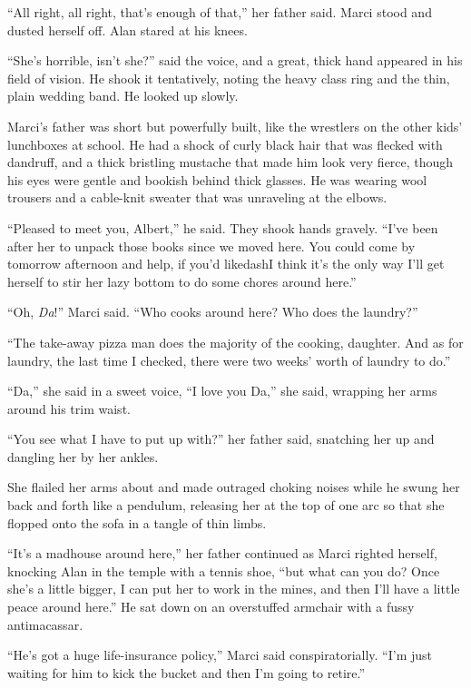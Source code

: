 ``All right, all right, that's enough of that,'' her father said. 
Marci stood and dusted herself off.  Alan stared at his knees.

``She's horrible, isn't she?'' said the voice, and a great, thick hand
appeared in his field of vision.  He shook it tentatively, noting the
heavy class ring and the thin, plain wedding band.  He looked up
slowly.

Marci's father was short but powerfully built, like the wrestlers on
the other kids' lunchboxes at school.  He had a shock of curly black
hair that was flecked with dandruff, and a thick bristling mustache
that made him look very fierce, though his eyes were gentle and
bookish behind thick glasses.  He was wearing wool trousers and a
cable-knit sweater that was unraveling at the elbows.

``Pleased to meet you, Albert,'' he said.  They shook hands gravely. 
``I've been after her to unpack those books since we moved here.  You
could come by tomorrow afternoon and help, if you'd likedash{}I think
it's the only way I'll get herself to stir her lazy bottom to do some
chores around here.''

``Oh, \textit{Da}!'' Marci said.  ``Who cooks around here?  Who does
the laundry?''

``The take-away pizza man does the majority of the cooking, daughter. 
And as for laundry, the last time I checked, there were two weeks'
worth of laundry to do.''

``Da,'' she said in a sweet voice, ``I love you Da,'' she said,
wrapping her arms around his trim waist.

``You see what I have to put up with?'' her father said, snatching her
up and dangling her by her ankles.

She flailed her arms about and made outraged choking noises while he
swung her back and forth like a pendulum, releasing her at the top of
one arc so that she flopped onto the sofa in a tangle of thin limbs.

``It's a madhouse around here,'' her father continued as Marci righted
herself, knocking Alan in the temple with a tennis shoe, ``but what
can you do?  Once she's a little bigger, I can put her to work in the
mines, and then I'll have a little peace around here.'' He sat down on
an overstuffed armchair with a fussy antimacassar.

``He's got a huge life-insurance policy,'' Marci said
conspiratorially.  ``I'm just waiting for him to kick the bucket and
then I'm going to retire.''

